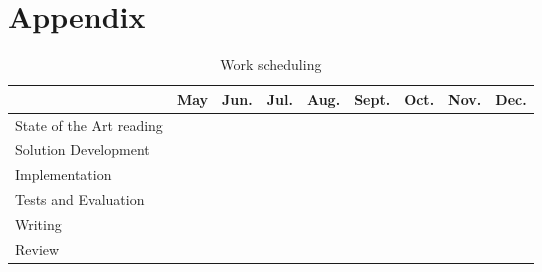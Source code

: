 \appendix
\section{Appendix} %
\label{sec:attachments}

\begin{table}[H]
  \label{sub:work_scheduling}
  \label{tab:worktable}
  \begin{center}
    \begin{tabular}{|l||c|c|c|c|c|c|c|c|}
    \hline & \textbf{May} & \textbf{Jun.} & \textbf{Jul.} & \textbf{Aug.} & \textbf{Sept.} & \textbf{Oct.} & \textbf{Nov.} & \textbf{Dec.}\\
    \hline
    \hline
      State of the Art reading & \cellcolor{black!25} & \cellcolor{black!25} &   &   &  & &  &  \\
    \hline
      Solution Development & \cellcolor{black!25} & \cellcolor{black!25} &   &   &   & &  &  \\
    \hline
      Implementation &  & \cellcolor{black!25} & \cellcolor{black!25} & \cellcolor{black!25} & \cellcolor{black!25} &  &   &  \\
    \hline
      Tests and Evaluation &  &  &   &  & \cellcolor{black!25} & \cellcolor{black!25} &  &  \\
    \hline
      Writing &  & \cellcolor{black!25} & \cellcolor{black!25} & \cellcolor{black!25}  & \cellcolor{black!25} & \cellcolor{black!25} & \cellcolor{black!25} & \cellcolor{black!25} \\
    \hline
      Review &  &  &  &  &  & & \cellcolor{black!25} & \cellcolor{black!25} \\
    \hline
    \end{tabular}
    \caption{Work scheduling}
  \end{center}
\end{table}